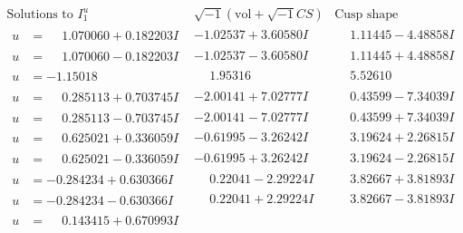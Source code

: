 \documentclass[1p]{elsarticle_modified}
\theoremstyle{definition}
\newcommand{\I}{\sqrt{-1}}
\begin{document}
$$\begin{array}{c|c|c}  
\text{Solutions to }I^u_{1}& \I (\text{vol} + \sqrt{-1}CS) & \text{Cusp shape}\\
 \hline 
\begin{aligned}
u &= \phantom{-}1.070060 + 0.182203 I\end{aligned}
 & -1.02537 + 3.60580 I & \phantom{-}1.11445 - 4.48858 I \\ \hline\begin{aligned}
u &= \phantom{-}1.070060 - 0.182203 I\end{aligned}
 & -1.02537 - 3.60580 I & \phantom{-}1.11445 + 4.48858 I \\ \hline\begin{aligned}
u &= -1.15018\phantom{ +0.000000I}\end{aligned}
 & \phantom{-}1.95316\phantom{ +0.000000I} & \phantom{-}5.52610\phantom{ +0.000000I} \\ \hline\begin{aligned}
u &= \phantom{-}0.285113 + 0.703745 I\end{aligned}
 & -2.00141 + 7.02777 I & \phantom{-}0.43599 - 7.34039 I \\ \hline\begin{aligned}
u &= \phantom{-}0.285113 - 0.703745 I\end{aligned}
 & -2.00141 - 7.02777 I & \phantom{-}0.43599 + 7.34039 I \\ \hline\begin{aligned}
u &= \phantom{-}0.625021 + 0.336059 I\end{aligned}
 & -0.61995 - 3.26242 I & \phantom{-}3.19624 + 2.26815 I \\ \hline\begin{aligned}
u &= \phantom{-}0.625021 - 0.336059 I\end{aligned}
 & -0.61995 + 3.26242 I & \phantom{-}3.19624 - 2.26815 I \\ \hline\begin{aligned}
u &= -0.284234 + 0.630366 I\end{aligned}
 & \phantom{-}0.22041 - 2.29224 I & \phantom{-}3.82667 + 3.81893 I \\ \hline\begin{aligned}
u &= -0.284234 - 0.630366 I\end{aligned}
 & \phantom{-}0.22041 + 2.29224 I & \phantom{-}3.82667 - 3.81893 I \\ \hline\begin{aligned}
u &= \phantom{-}0.143415 + 0.670993 I\end{aligned}

\end{array}$$
\end{document}
